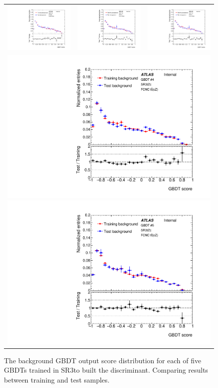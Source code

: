\begin{figure}[htbp]
	\centering
	\begin{tabular}{ccc}
		\includegraphics[width=.3\textwidth]{Chapters/CH5/figures/SR3_UsingSMT/BDT/GBDT_background_Fold1} &
		\includegraphics[width=.3\textwidth]{Chapters/CH5/figures/SR3_UsingSMT/BDT/GBDT_background_Fold2} &
		\includegraphics[width=.3\textwidth]{Chapters/CH5/figures/SR3_UsingSMT/BDT/GBDT_background_Fold3} \\ 
		\multicolumn{3}{c}{
		\includegraphics[width=.3\textwidth]{Chapters/CH5/figures/SR3_UsingSMT/BDT/GBDT_background_Fold4}
		\includegraphics[width=.3\textwidth]{Chapters/CH5/figures/SR3_UsingSMT/BDT/GBDT_background_Fold5}} \\
	\end{tabular}
	\caption{ The background GBDT output score distribution for each of five GBDTs trained in SR3\tZc to built the \Dthree discriminant. 
		Comparing results between training and test samples.
	}%
	\label{fig:separation:SR3:GBDTbkg}
\end{figure}

